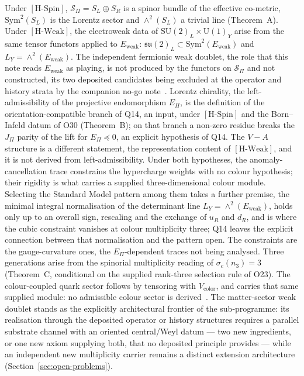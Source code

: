 \documentclass[11pt,a4paper]{article}
\theoremstyle{definition}
\newcommand{\SU}{\mathrm{SU}}
\newcommand{\su}{\mathfrak{su}}
\newcommand{\UU}{\mathrm{U}}
\newcommand{\Sbundle}{\mathcal{S}_\Pi}
\newcommand{\Epi}{E_\Pi}
\newcommand{\Ew}{E_{\mathrm{weak}}}
\newcommand{\HSpin}{\ensuremath{[\mathrm{H\text{-}Spin}]}}
\newcommand{\HWeak}{\ensuremath{[\mathrm{H\text{-}Weak}]}}
\begin{document}
    Under \HSpin{}, $\Sbundle = S_L \oplus S_R$ is a spinor bundle of the effective co-metric, $\mathrm{Sym}^2(S_L)$ is
    the Lorentz sector and $\wedge^2(S_L)$ a trivial line (Theorem~A).
    Under \HWeak{}, the electroweak data of $\SU(2)_L \times \UU(1)_Y$ arise from the same tensor functors applied to
    $\Ew$: $\su(2)_L \subset \mathrm{Sym}^2(\Ew)$ and $L_Y = \wedge^2(\Ew)$.
    The independent fermionic weak doublet, the role that this note reads $\Ew$ as playing, is not produced by the
      functors on
    $\Sbundle$ and not constructed, its two deposited candidates being excluded at the operator and history strata
    by the companion no-go note~\cite{Beau2026nsr}.
    Lorentz chirality, the left-admissibility of the projective endomorphism $\Epi$, is the definition of the
    orientation-compatible branch of Q14, an input, under \HSpin{} and the Born--Infeld datum of O30 (Theorem~B); on
    that branch a non-zero residue breaks the $J_\Pi$ parity of the lift for $\Epi\preceq0$, an explicit hypothesis of Q14.
    The $V-A$ structure is a different statement, the representation content of \HWeak{}, and it is not derived from
    left-admissibility.
    Under both hypotheses, the anomaly-cancellation trace constrains the hypercharge weights with no colour
    hypothesis; their rigidity is what carries a supplied three-dimensional colour module.
    Selecting the Standard Model pattern among them takes a further premise, the minimal integral
    normalisation of the determinant line $L_Y = \wedge^2(\Ew)$, holds only up to an overall sign, rescaling and the
    exchange of $u_R$ and $d_R$, and is where the cubic constraint vanishes at colour multiplicity three; Q14 leaves
    the explicit connection between that normalisation and the pattern open.
    The constraints are the gauge-curvature ones, the $\Epi$-dependent traces not being analysed.
    Three generations arise from the spinorial multiplicity reading of $\sigma_c(n_3) = 3$
    (Theorem~C, conditional on the supplied rank-three selection rule of O23).
    The colour-coupled quark sector follows by tensoring with $V_{\mathrm{color}}$, and carries that
    same supplied module: no admissible colour sector is derived~\cite{Beau2026a35}.
    The matter-sector weak doublet stands as the explicitly architectural frontier of the
    sub-programme: its realisation through the deposited operator or history structures
    requires a parallel substrate channel with an oriented central/Weyl datum --- two new
    ingredients, or one new axiom supplying both, that no deposited principle provides ---
    while an independent new multiplicity carrier remains a distinct extension architecture
    (Section~\ref{sec:open-problems}).
\end{document}
